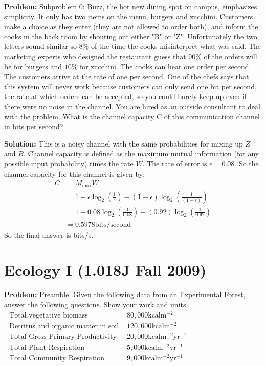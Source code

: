 \documentclass[10pt]{article}
\begin{document}
\textbf{Problem:}
Subproblem 0: Buzz, the hot new dining spot on campus, emphasizes simplicity. It only has two items on the menu, burgers and zucchini. Customers make a choice as they enter (they are not allowed to order both), and inform the cooks in the back room by shouting out either "B" or "Z". Unfortunately the two letters sound similar so $8 \%$ of the time the cooks misinterpret what was said. The marketing experts who designed the restaurant guess that $90 \%$ of the orders will be for burgers and $10 \%$ for zucchini.
The cooks can hear one order per second. The customers arrive at the rate of one per second. One of the chefs says that this system will never work because customers can only send one bit per second, the rate at which orders can be accepted, so you could barely keep up even if there were no noise in the channel. You are hired as an outside consultant to deal with the problem.
What is the channel capacity $\mathrm{C}$ of this communication channel in bits per second?


\textbf{Solution:}
This is a noisy channel with the same probabilities for mixing up $Z$ and $B$. Channel capacity is defined as the maximum mutual information (for any possible input probability) times the rate $W$. The rate of error is $\epsilon=0.08$. So the channel capacity for this channel is given by:
\[
\begin{aligned}
C &=M_{\max } W \\
&=1-\epsilon \log _{2}\left(\frac{1}{\epsilon}\right)-(1-\epsilon) \log _{2}\left(\frac{1}{(1-\epsilon)}\right) \\
&=1-0.08 \log _{2}\left(\frac{1}{0.08}\right)-(0.92) \log _{2}\left(\frac{1}{0.92}\right) \\
&=0.5978 \mathrm{bits} / \mathrm{second}
\end{aligned}
\]
So the final answer is  bits/s.


\section{Ecology I (1.018J Fall 2009)}

\textbf{Problem:}
Preamble: Given the following data from an Experimental Forest, answer the following questions. Show your work and units.
$\begin{array}{ll}\text { Total vegetative biomass } & 80,000 \mathrm{kcal} \mathrm{m}^{-2} \\ \text { Detritus and organic matter in soil } & 120,000 \mathrm{kcal } \mathrm{m}^{-2} \\ \text { Total Gross Primary Productivity } & 20,000 \mathrm{kcal } \mathrm{m}^{-2} \mathrm{yr}^{-1} \\ \text { Total Plant Respiration } & 5,000 \mathrm{kcal} \mathrm{m}^{-2} \mathrm{yr}^{-1} \\ \text { Total Community Respiration } & 9,000 \mathrm{kcal} \mathrm{m}^{-2} \mathrm{yr}^{-1}\end{array}$
\end{document}
